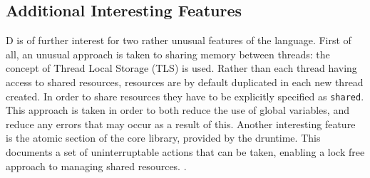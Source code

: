 \subsection{Additional Interesting Features}

D is of further interest for two rather unusual features of the language.
First of all, an unusual approach is taken to sharing memory between threads: 
the concept of Thread Local Storage (TLS) is used. 
Rather than each thread having access to shared resources, resources are by 
default duplicated in each new thread created. In order to share resources they 
have to be explicitly specified as \texttt{shared}. This approach is taken in 
order to both reduce the use of global variables, and reduce any errors that may
occur as a result of this. \cite{dlang website for migrating to shared}
Another interesting feature is the atomic section of the core library, provided 
by the druntime. This documents a set of uninterruptable actions that can be taken, 
enabling a lock free approach to managing shared resources. \cite{shared documentation}.

